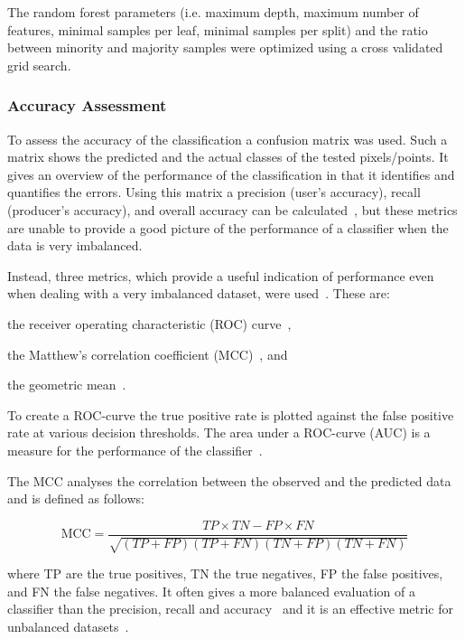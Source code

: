 {The random forest parameters (i.e. maximum depth, maximum number of features, minimal samples per leaf, minimal samples per split) and the ratio between minority and majority samples were optimized using a cross validated grid search.

\subsubsection{Accuracy Assessment}

To assess the accuracy of the classification a confusion matrix was used. Such a matrix shows the predicted and the actual classes of the tested pixels/points. It gives an overview of the performance of the classification in that it identifies and quantifies the errors. Using this matrix a precision (user's accuracy), recall (producer's accuracy), and overall accuracy can be calculated~\citep{stehman1997selecting}, but these metrics are unable to provide a good picture of the performance of a classifier when the data is very imbalanced.

Instead, three metrics, which provide a useful indication of performance even when dealing with a very imbalanced dataset, were used~\citep{sun2009classification, lopez2013insight}. These are:
\begin{enumerate*}[(i)]
	\item the receiver operating characteristic (ROC) curve~\citep{bradley1997use},
	\item the Matthew's correlation coefficient (MCC)~\citep{matthews1975comparison}, and
	\item the geometric mean~\citep{kubat1998machine}.
\end{enumerate*}

To create a ROC-curve the true positive rate is plotted against the false positive rate at various decision thresholds. The area under a ROC-curve (AUC) is a measure for the performance of the classifier~\citep{bradley1997use}.

The MCC analyses the correlation between the observed and the predicted data and is defined as follows:

\begin{equation}
	\label{eq:MCC}
	{\text{MCC}}={\frac  {TP\times TN-FP\times FN}{{\sqrt  {(TP+FP)(TP+FN)(TN+FP)(TN+FN)}}}}
\end{equation}

where TP are the true positives, TN the true negatives, FP the false positives, and FN the false negatives. It often gives a more balanced evaluation of a classifier than the precision, recall and accuracy~\citep{baldi2000assessing} and it is an effective metric for unbalanced datasets~\citep{kohavi1995study}.

}
